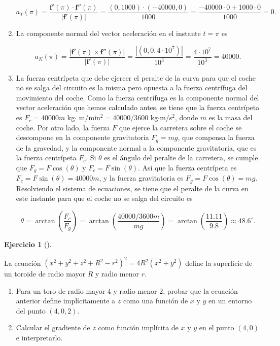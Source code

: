 \documentclass[
  a4paper,
]{scrreport}
\theoremstyle{definition}
\newtheorem{exercise}{Ejercicio}[chapter]
\theoremstyle{remark}
\begin{document}
\begin{tcolorbox}
\begin{enumerate}
  \[
  a_T(\pi) = \frac{\mathbf{f}'(\pi)\cdot \mathbf{f}''(\pi)}{|\mathbf{f}'(\pi)|} = \frac{(0,1000)\cdot (-40000,0)}{1000} = \frac{-40000\cdot 0 + 1000\cdot 0}{1000} = 0.
  \]
\item
  La componente normal del vector aceleración en el instante \(t=\pi\)
  es

  \[
  a_N(\pi) = \frac{|\mathbf{f}'(\pi)\times \mathbf{f}''(\pi)|}{|\mathbf{f}'(\pi)|} = \frac{|(0,0,4\cdot 10^7)|}{10^3} = \frac{4\cdot 10^7}{10^3} = 40000.
  \]
\item
  La fuerza centrípeta que debe ejercer el peralte de la curva para que
  el coche no se salga del circuito es la misma pero opuesta a la fuerza
  centrífuga del movimiento del coche. Como la fuerza centrífuga es la
  componente normal del vector aceleración que hemos calculado antes, se
  tiene que la fuerza centrípeta es \(F_c = 40000m\) kg\(\cdot\)
  m/min\(^2 = 40000/3600\) kg\(\cdot\)m/s\(^2\), donde \(m\) es la masa
  del coche. Por otro lado, la fuerza \(F\) que ejerce la carretera
  sobre el coche se descompone en la componente gravitatoria \(F_g=mg\),
  que compensa la fuerza de la gravedad, y la componente normal a la
  componente gravitatoria, que es la fuerza centrípeta \(F_c\). Si
  \(\theta\) es el ángulo del peralte de la carretera, se cumple que
  \(F_g = F\cos(\theta)\) y \(F_c = F\sin(\theta)\). Así que la fuerza
  centrípeta es \(F_c = F\sin(\theta) = 40000m\), y la fuerza
  gravitatoria es \(F_g = F\cos(\theta) = mg\). Resolviendo el sistema
  de ecuaciones, se tiene que el peralte de la curva en este instante
  para que el coche no se salga del circuito es

  \[
  \theta 
  = \arctan\left(\frac{F_c}{F_g}\right) 
  = \arctan\left(\frac{40000/3600m}{mg}\right) 
  = \arctan\left(\frac{11.11}{9.8}\right)
  \approx 48.6^\circ.
  \]
\end{enumerate}

\end{tcolorbox}

\begin{exercise}[]\protect\hypertarget{exr-3}{}\label{exr-3}

La ecuación \((x^2+y^2+z^2+R^2-r^2)^2 = 4R^2(x^2+y^2)\) define la
superficie de un toroide de radio mayor \(R\) y radio menor \(r\).

\begin{enumerate}
\def\labelenumi{\alph{enumi}.}
\item
  Para un toro de radio mayor \(4\) y radio menor \(2\), probar que la
  ecuación anterior define implícitamente a \(z\) como una función de
  \(x\) y \(y\) en un entorno del punto \((4,0,2)\).
\item
  Calcular el gradiente de \(z\) como función implícita de \(x\) y \(y\)
  en el punto \((4,0)\) e interpretarlo.
\end{enumerate}

\end{exercise}
\end{document}
